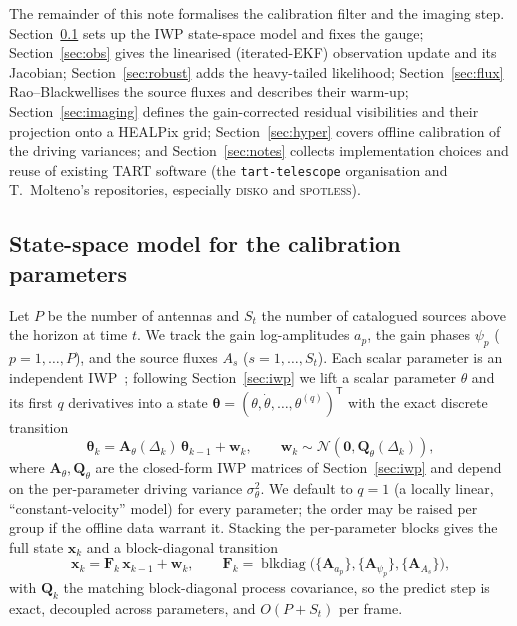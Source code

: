 \documentclass[11pt]{article}
\newcommand{\Norm}{\mathcal{N}}
\newcommand{\T}{^{\mathsf{T}}}
\begin{document}
The remainder of this note formalises the calibration filter and the imaging step. Section~\ref{sec:statespace} sets up the IWP state-space model and fixes the gauge; Section~\ref{sec:obs} gives the linearised (iterated-EKF) observation update and its Jacobian; Section~\ref{sec:robust} adds the heavy-tailed likelihood; Section~\ref{sec:flux} Rao--Blackwellises the source fluxes and describes their warm-up; Section~\ref{sec:imaging} defines the gain-corrected residual visibilities and their projection onto a HEALPix grid; Section~\ref{sec:hyper} covers offline calibration of the driving variances; and Section~\ref{sec:notes} collects implementation choices and reuse of existing TART software (the \texttt{tart-telescope} organisation and T.~Molteno's repositories, especially \textsc{disko} and \textsc{spotless}).

\subsection{State-space model for the calibration parameters}
\label{sec:statespace}

Let $P$ be the number of antennas and $S_t$ the number of catalogued sources above the
horizon at time $t$. We track the gain log-amplitudes $a_p$, the gain phases $\psi_p$
($p=1,\dots,P$), and the source fluxes $A_s$ ($s=1,\dots,S_t$). Each scalar parameter is an
independent IWP~\cite{sarkka}; following Section~\ref{sec:iwp} we lift a scalar parameter $\theta$ and
its first $q$ derivatives into a state $\bm{\theta}=(\theta,\dot\theta,\dots,\theta^{(q)})\T$
with the exact discrete transition
\begin{equation}
  \bm{\theta}_k = \bm{A}_\theta(\Delta_k)\,\bm{\theta}_{k-1}+\bm{w}_k,
  \qquad \bm{w}_k\sim\Norm(\bm 0,\bm{Q}_\theta(\Delta_k)),
\end{equation}
where $\bm{A}_\theta,\bm{Q}_\theta$ are the closed-form IWP matrices of Section~\ref{sec:iwp} and depend on the per-parameter driving variance $\sigma_\theta^2$. We default to
$q=1$ (a locally linear, ``constant-velocity'' model) for every parameter; the order may be
raised per group if the offline data warrant it. Stacking the per-parameter blocks gives the
full state $\bm{x}_k$ and a block-diagonal transition
\begin{equation}
  \bm{x}_k=\bm{F}_k\,\bm{x}_{k-1}+\bm{w}_k,
  \qquad \bm{F}_k=\operatorname{blkdiag}\big(\{\bm{A}_{a_p}\},\{\bm{A}_{\psi_p}\},\{\bm{A}_{A_s}\}\big),
\end{equation}
with $\bm{Q}_k$ the matching block-diagonal process covariance, so the predict step is exact,
decoupled across parameters, and $O(P+S_t)$ per frame.
\end{document}
